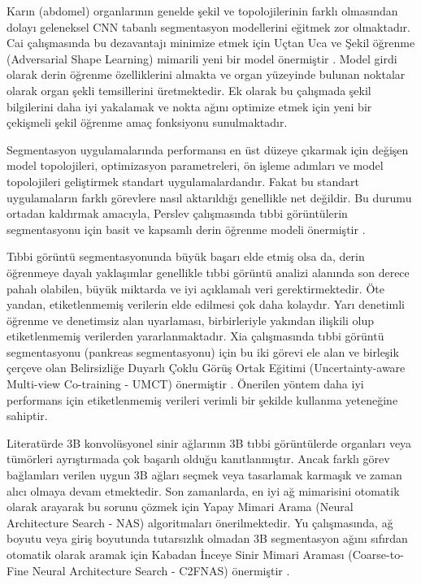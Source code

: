 Karın (abdomel) organlarının genelde şekil ve topolojilerinin farklı olmasından dolayı geleneksel CNN tabanlı segmentasyon modellerini eğitmek zor olmaktadır. Cai çalışmasında bu dezavantajı minimize etmek için Uçtan Uca ve Şekil öğrenme (Adversarial Shape Learning) mimarili yeni bir model önermiştir \cite{cai2019end}. Model girdi olarak derin öğrenme özelliklerini almakta ve organ yüzeyinde bulunan noktalar olarak organ şekli temsillerini üretmektedir. Ek olarak bu çalışmada şekil bilgilerini daha iyi yakalamak ve nokta ağını optimize etmek için yeni bir çekişmeli şekil öğrenme amaç fonksiyonu sunulmaktadır.

Segmentasyon uygulamalarında performansı en üst düzeye çıkarmak için değişen model topolojileri, optimizasyon parametreleri, ön işleme adımları ve model topolojileri geliştirmek standart uygulamalardandır. Fakat bu standart uygulamaların farklı görevlere nasıl aktarıldığı genellikle net değildir. Bu durumu ortadan kaldırmak amacıyla, Perslev çalışmasında tıbbi görüntülerin segmentasyonu için basit ve kapsamlı derin öğrenme modeli önermiştir \cite{perslev2019one}. 

Tıbbi görüntü segmentasyonunda büyük başarı elde etmiş olsa da, derin öğrenmeye dayalı yaklaşımlar genellikle tıbbi görüntü analizi alanında son derece pahalı olabilen, büyük miktarda ve iyi açıklamalı veri gerektirmektedir. Öte yandan, etiketlenmemiş verilerin elde edilmesi çok daha kolaydır. Yarı denetimli öğrenme ve denetimsiz alan uyarlaması, birbirleriyle yakından ilişkili olup etiketlenmemiş verilerden yararlanmaktadır. Xia çalışmasında tıbbi görüntü segmentasyonu (pankreas segmentasyonu) için bu iki görevi ele alan ve birleşik çerçeve olan Belirsizliğe Duyarlı Çoklu Görüş Ortak Eğitimi (Uncertainty-aware Multi-view Co-training  - UMCT) önermiştir \cite{xia2020uncertainty}. Önerilen yöntem daha iyi performans için etiketlenmemiş verileri verimli bir şekilde kullanma yeteneğine sahiptir.

Literatürde 3B konvolüsyonel sinir ağlarının 3B tıbbi görüntülerde organları veya tümörleri ayrıştırmada çok başarılı olduğu kanıtlanmıştır. Ancak farklı görev bağlamları verilen uygun 3B ağları seçmek veya tasarlamak karmaşık ve zaman alıcı olmaya devam etmektedir. Son zamanlarda, en iyi ağ mimarisini otomatik olarak arayarak bu sorunu çözmek için Yapay Mimari Arama (Neural Architecture Search - NAS) algoritmaları önerilmektedir. Yu çalışmasında, ağ boyutu veya giriş boyutunda tutarsızlık olmadan 3B segmentasyon ağını sıfırdan otomatik olarak aramak için Kabadan İnceye Sinir Mimari Araması (Coarse-to-Fine Neural Architecture Search - C2FNAS) önermiştir \cite{yu2020c2fnas}.

